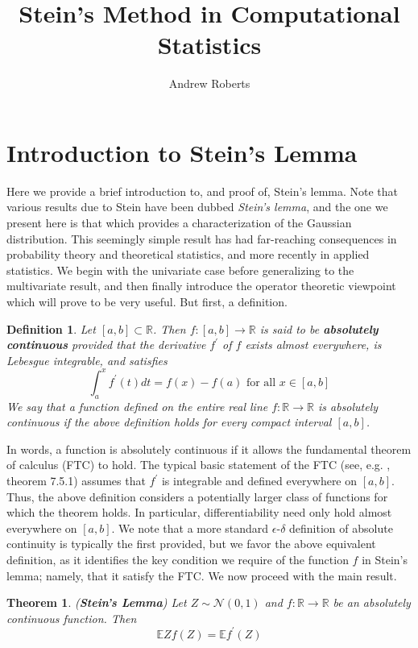 \documentclass[12pt]{article}
\title{Stein's Method in Computational Statistics}
\author{Andrew Roberts}
\newcommand{\R}{\mathbb{R}}
\newcommand{\E}{\mathbb{E}}
\newcommand{\Gaussian}{\mathcal{N}}
\newtheorem{definition}{Definition}
\newtheorem{thm}{Theorem}
\begin{document}
\maketitle
\tableofcontents
\newpage

\section{Introduction to Stein's Lemma}
Here we provide a brief introduction to, and proof of, Stein's lemma. Note that various results due to Stein have been dubbed \textit{Stein's lemma}, and the one we present here is that which provides a 
characterization of the Gaussian distribution. This seemingly simple result has had far-reaching consequences in probability theory and theoretical statistics, and more recently in applied statistics. We begin 
with the univariate case before generalizing to the multivariate result, and then finally introduce the operator theoretic viewpoint which will prove to be very useful. But first, a definition. 

\begin{definition}
Let $[a, b] \subset \R$. Then $f: [a, b] \to \R$ is said to be \textbf{absolutely continuous} provided that the derivative $f^\prime$ of $f$ exists almost everywhere, is Lebesgue integrable, and satisfies 
\[
\int_{a}^{x} f^\prime(t) dt = f(x) - f(a) \text{ for all } x \in [a, b]
\]
We say that a function defined on the entire real line $f: \R \to \R$ is absolutely continuous if the above definition holds for every compact interval $[a, b]$. 
\end{definition}
In words, a function is absolutely continuous if it allows the fundamental theorem of calculus (FTC) to hold. The typical basic statement of the FTC
(see, e.g. \cite{Abbott}, theorem 7.5.1) assumes that $f^\prime$ is integrable and defined everywhere on $[a, b]$. Thus, the above definition considers a potentially larger class of functions 
for which the theorem holds. In particular, differentiability need only hold almost everywhere on $[a, b]$. We note that a more standard $\epsilon$-$\delta$ definition of absolute continuity is 
typically the first provided, but we favor the above equivalent definition, as it identifies the key condition we require of the function $f$ in Stein's lemma; namely, that it satisfy the FTC. 
We now proceed with the main result. 

\begin{thm} 
(\textbf{Stein's Lemma}) Let $Z \sim \Gaussian(0, 1)$ and $f: \R \to \R$ be an absolutely continuous function. Then 
\[
\E Z f(Z) = \E f^\prime(Z)
\]
\end{thm}
\end{document}
